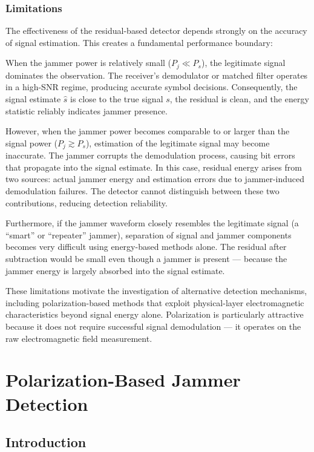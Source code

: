 \documentclass{article}
\begin{document}
\subsubsection{Limitations}

The effectiveness of the residual-based detector depends strongly on the accuracy of signal estimation. This creates a fundamental performance boundary:

When the jammer power is relatively small ($P_j \ll P_s$), the legitimate signal dominates the observation. The receiver's demodulator or matched filter operates in a high-SNR regime, producing accurate symbol decisions. Consequently, the signal estimate $\hat{s}$ is close to the true signal $s$, the residual is clean, and the energy statistic reliably indicates jammer presence.

However, when the jammer power becomes comparable to or larger than the signal power ($P_j \gtrsim P_s$), estimation of the legitimate signal may become inaccurate. The jammer corrupts the demodulation process, causing bit errors that propagate into the signal estimate. In this case, residual energy arises from two sources: actual jammer energy and estimation errors due to jammer-induced demodulation failures. The detector cannot distinguish between these two contributions, reducing detection reliability.

Furthermore, if the jammer waveform closely resembles the legitimate signal (a ``smart'' or ``repeater'' jammer), separation of signal and jammer components becomes very difficult using energy-based methods alone. The residual after subtraction would be small even though a jammer is present — because the jammer energy is largely absorbed into the signal estimate.

These limitations motivate the investigation of alternative detection mechanisms, including polarization-based methods that exploit physical-layer electromagnetic characteristics beyond signal energy alone. Polarization is particularly attractive because it does not require successful signal demodulation — it operates on the raw electromagnetic field measurement.

\newpage

\section{Polarization-Based Jammer Detection}


\subsection{Introduction}
\end{document}
